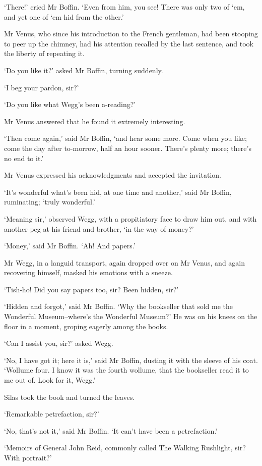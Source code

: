 ‘There!’ cried Mr Boffin. ‘Even from him, you see! There was only two of
‘em, and yet one of ‘em hid from the other.’

Mr Venus, who since his introduction to the French gentleman, had been
stooping to peer up the chimney, had his attention recalled by the last
sentence, and took the liberty of repeating it.

‘Do you like it?’ asked Mr Boffin, turning suddenly.

‘I beg your pardon, sir?’

‘Do you like what Wegg’s been a-reading?’

Mr Venus answered that he found it extremely interesting.

‘Then come again,’ said Mr Boffin, ‘and hear some more. Come when you
like; come the day after to-morrow, half an hour sooner. There’s plenty
more; there’s no end to it.’

Mr Venus expressed his acknowledgments and accepted the invitation.

‘It’s wonderful what’s been hid, at one time and another,’ said Mr
Boffin, ruminating; ‘truly wonderful.’

‘Meaning sir,’ observed Wegg, with a propitiatory face to draw him out,
and with another peg at his friend and brother, ‘in the way of money?’

‘Money,’ said Mr Boffin. ‘Ah! And papers.’

Mr Wegg, in a languid transport, again dropped over on Mr Venus, and
again recovering himself, masked his emotions with a sneeze.

‘Tish-ho! Did you say papers too, sir? Been hidden, sir?’

‘Hidden and forgot,’ said Mr Boffin. ‘Why the bookseller that sold me
the Wonderful Museum--where’s the Wonderful Museum?’ He was on his knees
on the floor in a moment, groping eagerly among the books.

‘Can I assist you, sir?’ asked Wegg.

‘No, I have got it; here it is,’ said Mr Boffin, dusting it with the
sleeve of his coat. ‘Wollume four. I know it was the fourth wollume,
that the bookseller read it to me out of. Look for it, Wegg.’

Silas took the book and turned the leaves.

‘Remarkable petrefaction, sir?’

‘No, that’s not it,’ said Mr Boffin. ‘It can’t have been a
petrefaction.’

‘Memoirs of General John Reid, commonly called The Walking Rushlight,
sir? With portrait?’

